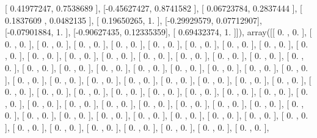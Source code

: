 \documentclass{article}
\begin{document}
       [ 0.41977247,  0.7538689 ],
       [-0.45627427,  0.8741582 ],
       [ 0.06723784,  0.2837444 ],
       [ 0.1837609 ,  0.0482135 ],
       [ 0.19650265,  1.        ],
       [-0.29929579,  0.07712907],
       [-0.07901884,  1.        ],
       [-0.90627435,  0.12335359],
       [ 0.69432374,  1.        ]]), array([[ 0.        ,  0.        ],
       [ 0.        ,  0.        ],
       [ 0.        ,  0.        ],
       [ 0.        ,  0.        ],
       [ 0.        ,  0.        ],
       [ 0.        ,  0.        ],
       [ 0.        ,  0.        ],
       [ 0.        ,  0.        ],
       [ 0.        ,  0.        ],
       [ 0.        ,  0.        ],
       [ 0.        ,  0.        ],
       [ 0.        ,  0.        ],
       [ 0.        ,  0.        ],
       [ 0.        ,  0.        ],
       [ 0.        ,  0.        ],
       [ 0.        ,  0.        ],
       [ 0.        ,  0.        ],
       [ 0.        ,  0.        ],
       [ 0.        ,  0.        ],
       [ 0.        ,  0.        ],
       [ 0.        ,  0.        ],
       [ 0.        ,  0.        ],
       [ 0.        ,  0.        ],
       [ 0.        ,  0.        ],
       [ 0.        ,  0.        ],
       [ 0.        ,  0.        ],
       [ 0.        ,  0.        ],
       [ 0.        ,  0.        ],
       [ 0.        ,  0.        ],
       [ 0.        ,  0.        ],
       [ 0.        ,  0.        ],
       [ 0.        ,  0.        ],
       [ 0.        ,  0.        ],
       [ 0.        ,  0.        ],
       [ 0.        ,  0.        ],
       [ 0.        ,  0.        ],
       [ 0.        ,  0.        ],
       [ 0.        ,  0.        ],
       [ 0.        ,  0.        ],
       [ 0.        ,  0.        ],
       [ 0.        ,  0.        ],
       [ 0.        ,  0.        ],
       [ 0.        ,  0.        ],
       [ 0.        ,  0.        ],
       [ 0.        ,  0.        ],
       [ 0.        ,  0.        ],
       [ 0.        ,  0.        ],
       [ 0.        ,  0.        ],
       [ 0.        ,  0.        ],
       [ 0.        ,  0.        ],
       [ 0.        ,  0.        ],
       [ 0.        ,  0.        ],
       [ 0.        ,  0.        ],
       [ 0.        ,  0.        ],
       [ 0.        ,  0.        ],
       [ 0.        ,  0.        ],
       [ 0.        ,  0.        ],
       [ 0.        ,  0.        ],
       [ 0.        ,  0.        ],
       [ 0.        ,  0.        ],
       [ 0.        ,  0.        ],
       [ 0.        ,  0.        ],
       [ 0.        ,  0.        ],
       [ 0.        ,  0.        ],
       [ 0.        ,  0.        ],
       [ 0.        ,  0.        ],
\end{document}

